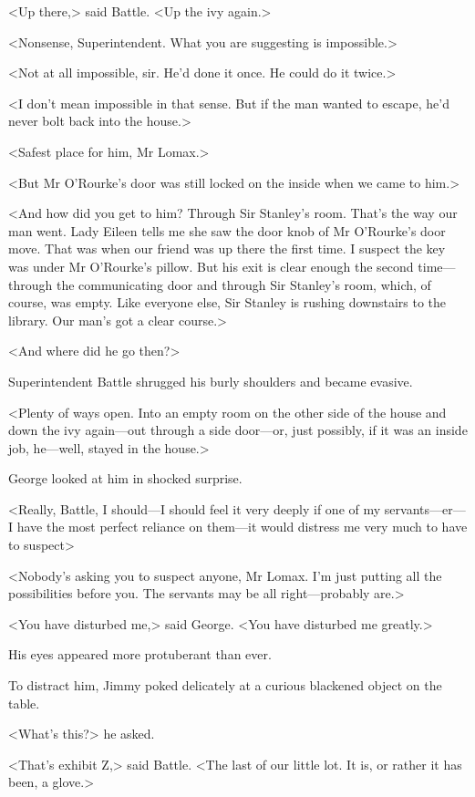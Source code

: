 <Up there,> said Battle. <Up the ivy again.>

<Nonsense, Superintendent. What you are suggesting is impossible.>

<Not at all impossible, sir. He'd done it once. He could do it twice.>

<I don't mean impossible in that sense. But if the man wanted to escape, he'd never bolt back into the house.>

<Safest place for him, Mr Lomax.>

<But Mr O'Rourke's door was still locked on the inside when we came to him.>

<And how did you get to him? Through Sir Stanley's room. That's the way our man went. Lady Eileen tells me she saw the door knob of Mr O'Rourke's door move. That was when our friend was up there the first time. I suspect the key was under Mr O'Rourke's pillow. But his exit is clear enough the second time—through the communicating door and through Sir Stanley's room, which, of course, was empty. Like everyone else, Sir Stanley is rushing downstairs to the library. Our man's got a clear course.>

<And where did he go then?>

Superintendent Battle shrugged his burly shoulders and became evasive.

<Plenty of ways open. Into an empty room on the other side of the house and down the ivy again—out through a side door—or, just possibly, if it was an inside job, he—well, stayed in the house.>

George looked at him in shocked surprise.

<Really, Battle, I should—I should feel it very deeply if one of my servants—er—I have the most perfect reliance on them—it would distress me very much to have to suspect\longdash>

<Nobody's asking you to suspect anyone, Mr Lomax. I'm just putting all the possibilities before you. The servants may be all right—probably are.>

<You have disturbed me,> said George. <You have disturbed me greatly.>

His eyes appeared more protuberant than ever.

To distract him, Jimmy poked delicately at a curious blackened object on the table.

<What's this?> he asked.

<That's exhibit Z,> said Battle. <The last of our little lot. It is, or rather it has been, a glove.>

